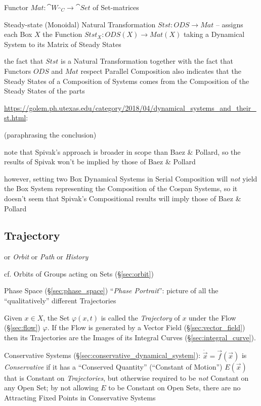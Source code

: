 Functor $Mat : \cat{W}_{\cat{C}} \rightarrow \cat{Set}$ of Set-matrices

Steady-state (Monoidal) Natural Transformation $Stst : ODS \rightarrow Mat$ --
assigns each Box $X$ the Function $Stst_X : ODS(X) \rightarrow Mat(X)$ taking a
Dynamical System to its Matrix of Steady States

the fact that $Stst$ is a Natural Transformation together with the fact that
Functors $ODS$ and $Mat$ respect Parallel Composition also indicates that the
Steady States of a Composition of Systems comes from the Composition of the
Steady States of the parts

\url{https://golem.ph.utexas.edu/category/2018/04/dynamical_systems_and_their_st.html}:

(paraphrasing the conclusion)

note that Spivak's approach is broader in scope than Baez \& Pollard, so the
results of Spivak won't be implied by those of Baez \& Pollard

however, setting two Box Dynamical Systems in Serial Composition will
\emph{not} yield the Box System representing the Composition of the Cospan
Systems, so it doesn't seem that Spivak's Compositional results will imply
those of Baez \& Pollard



\subsection{Trajectory}\label{sec:trajectory}

or \emph{Orbit} or \emph{Path} or \emph{History}

\fist cf. Orbits of Groups acting on Sets (\S\ref{sec:orbit})

Phase Space (\S\ref{sec:phase_space}) ``\emph{Phase Portrait}'': picture of all
the ``qualitatively'' different Trajectories

Given $x \in X$, the Set $\varphi(x,t)$ is called the \emph{Trajectory} of $x$
under the Flow (\S\ref{sec:flow}) $\varphi$. If the Flow is generated by a
Vector Field (\S\ref{sec:vector_field}) then its Trajectories are the Images of
its Integral Curves (\S\ref{sec:integral_curve}).

Conservative Systems (\S\ref{sec:conservative_dynamical_system}):
$\dot{\vec{x}} = \vec{f}(\vec{x})$ is \emph{Conservative} if it has a
``Conserved Quantity'' (``Constant of Motion'') $E(\vec{x})$ that is Constant
on \emph{Trajectories}, but otherwise required to be \emph{not} Constant on any
Open Set;
by not allowing $E$ to be Constant on Open Sets, there are no Attracting Fixed
Points in Conservative Systems



